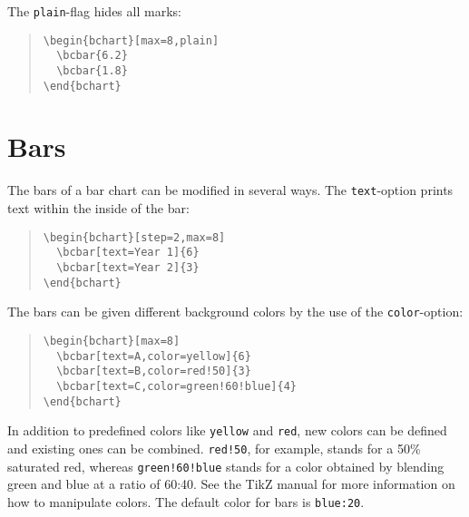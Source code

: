 \documentclass{article}
\begin{document}
The \texttt{plain}-flag hides all marks:
\begin{quote}\small
\begin{verbatim}
\begin{bchart}[max=8,plain]
  \bcbar{6.2}
  \bcbar{1.8}
\end{bchart}
\end{verbatim}
\end{quote}
\begin{quote}
\begin{bchart}[max=8,plain]
\end{bchart}
\end{quote}


\section{Bars}

The bars of a bar chart can be modified in several ways. The \texttt{text}-option prints text within the inside of the bar:
\begin{quote}\small
\begin{verbatim}
\begin{bchart}[step=2,max=8]
  \bcbar[text=Year 1]{6}
  \bcbar[text=Year 2]{3}
\end{bchart}
\end{verbatim}
\end{quote}
\begin{quote}
\begin{bchart}[step=2,max=8]
\end{bchart}
\end{quote}

The bars can be given different background colors by the use of the \texttt{color}-option:
\begin{quote}\small
\begin{verbatim}
\begin{bchart}[max=8]
  \bcbar[text=A,color=yellow]{6}
  \bcbar[text=B,color=red!50]{3}
  \bcbar[text=C,color=green!60!blue]{4}
\end{bchart}
\end{verbatim}
\end{quote}
\begin{quote}
\begin{bchart}[max=8]
\end{bchart}
\end{quote}
In addition to predefined colors like \texttt{yellow} and \texttt{red}, new colors can be defined and existing ones can be combined. \texttt{red!50}, for example, stands for a 50\% saturated red, whereas \texttt{green!60!blue} stands for a color obtained by blending green and blue at a ratio of 60:40. See the TikZ manual for more information on how to manipulate colors. The default color for bars is \texttt{blue:20}.
\end{document}
